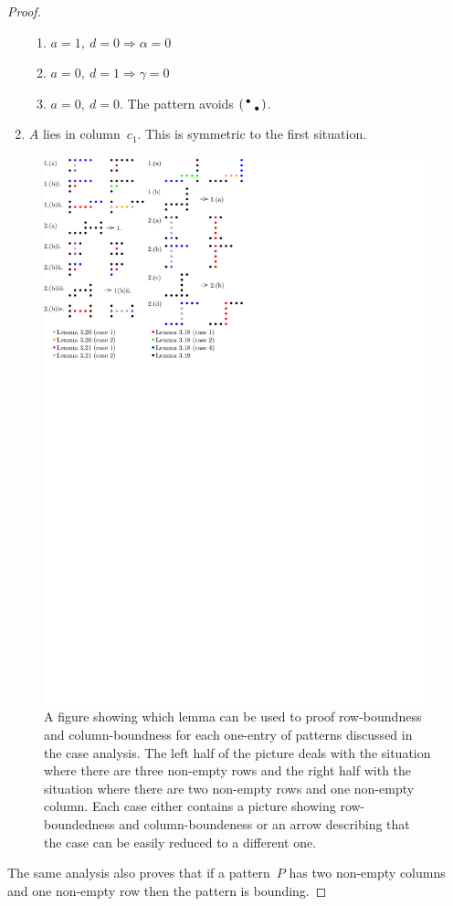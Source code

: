 \begin{proof}
\begin{enumerate}
\begin{enumerate}
		\item $a=1,\ d=0\Rightarrow\alpha=0$
		\item $a=0,\ d=1\Rightarrow\gamma=0$
		\item $a=0,\ d=0$. The pattern avoids $\left(\begin{smallmatrix}\bullet& \\ &\bullet\end{smallmatrix}\right)$.
	\end{enumerate}
\item $A$ lies in column~$c_1$. This is symmetric to the first situation.
\end{enumerate}
\begin{figure}[!ht]
	\centering
	\includegraphics[width=120mm]{img/caseana.pdf}
	\caption{A figure showing which lemma can be used to proof row-boundness and column-boundness for each one-entry of patterns discussed in the case analysis. The left half of the picture deals with the situation where there are three non-empty rows and the right half with the situation where there are two non-empty rows and one non-empty column. Each case either contains a picture showing row-boundedness and column-boundeness or an arrow describing that the case can be easily reduced to a different one.}
	\label{fig:pictproof1}
\end{figure}
The same analysis also proves that if a pattern~$P$ has two non-empty columns and one non-empty row then the pattern is bounding.
\end{proof}


